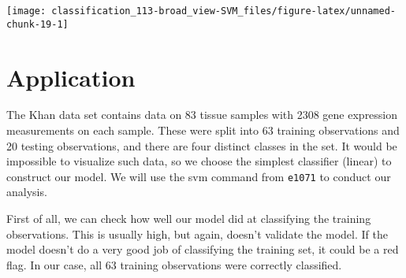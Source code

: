 \documentclass[]{book}
\newenvironment{Shaded}{\begin{snugshade}}{\end{snugshade}}
\newcommand{\CommentTok}[1]{\textcolor[rgb]{0.56,0.35,0.01}{\textit{#1}}}
\newcommand{\DataTypeTok}[1]{\textcolor[rgb]{0.13,0.29,0.53}{#1}}
\newcommand{\DecValTok}[1]{\textcolor[rgb]{0.00,0.00,0.81}{#1}}
\newcommand{\KeywordTok}[1]{\textcolor[rgb]{0.13,0.29,0.53}{\textbf{#1}}}
\newcommand{\NormalTok}[1]{#1}
\newcommand{\OperatorTok}[1]{\textcolor[rgb]{0.81,0.36,0.00}{\textbf{#1}}}
\newcommand{\StringTok}[1]{\textcolor[rgb]{0.31,0.60,0.02}{#1}}
\begin{document}
\begin{center}\texttt{[image: classification\_113-broad\_view-SVM\_files/figure-latex/unnamed-chunk-19-1]} \end{center}

\hypertarget{application}{%
\section{Application}\label{application}}

The Khan data set contains data on 83 tissue samples with 2308 gene expression measurements on each sample. These were split into 63 training observations and 20 testing observations, and there are four distinct classes in the set. It would be impossible to visualize such data, so we choose the simplest classifier (linear) to construct our model. We will use the svm command from \texttt{e1071} to conduct our analysis.

\begin{Shaded}
\end{Shaded}

First of all, we can check how well our model did at classifying the training observations. This is usually high, but again, doesn't validate the model. If the model doesn't do a very good job of classifying the training set, it could be a red flag. In our case, all 63 training observations were correctly classified.

\begin{Shaded}
\end{Shaded}
\end{document}
